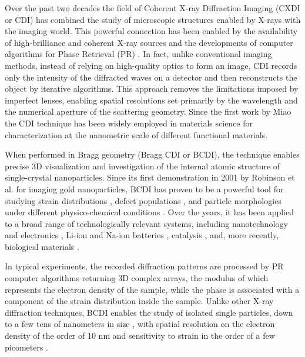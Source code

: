 Over the past two decades the field of Coherent X-ray Diffraction Imaging (CXDI or CDI) has combined the study of microscopic structures 
enabled by X-rays with the imaging world. This powerful connection has been enabled by the availability of high-brilliance and 
coherent X-ray sources and the developments of computer algorithms for Phase Retrieval (PR) \cite{fienup_reconstruction_1978, fienup_phase_1982,Luke_2004}. 
In fact, unlike conventional imaging methods, 
instead of relying on high-quality optics to form an image, CDI records only the intensity of the diffracted waves on 
a detector and then reconstructs the object by iterative algorithms. 
This approach removes the limitations imposed by imperfect lenses, enabling spatial resolutions set primarily by the 
wavelength and the numerical aperture of the scattering geometry. 
Since the first work by Miao \cite{Miao1998} the CDI technique has been widely employed in materials science for 
characterization at the nanometric scale of different functional materials. \cite{Neutze2000, Chapman2005, Schroer2008, Rodriguez2015}

When performed in Bragg geometry (Bragg CDI or BCDI), the technique enables precise 3D visualization and investigation 
of the internal atomic structure of single-crystal nanoparticles. Since its first demonstration in 2001 by Robinson 
et al. \cite{Robinson_gold_2001} for imaging gold nanoparticles, BCDI has proven to be a powerful tool for studying 
strain distributions \cite{pfeifer2006three, Robinson2009, Newton2010}, defect populations \cite{Favre-Nicolin_2010, Labat2015, Dupraz2017}, 
and particle morphologies under different physico-chemical conditions \cite{Carnis2021, FacetStrain2022, Chatelier2024, 
Grimes2024}. Over the years, it has been applied to a broad range of technologically relevant systems, including 
nanotechnology and electronics \cite{Favre-Nicolin_2010}, Li-ion and Na-ion batteries \cite{Singer2018, Serban2024}, 
catalysis \cite{atlan_imaging_2023}, and, more recently, biological materials \cite{Grunewald:ro5042}.

In typical experiments, the recorded diffraction patterns are processed by PR computer algorithms returning 
3D complex arrays, the modulus of which represents the electron density of the sample, while the phase is associated with
a component of the strain distribution inside the sample.  
Unlike other X-ray diffraction techniques, BCDI enables the study of isolated single particles, down to a few tens of 
nanometers in size \cite{MAXIV60nm, MIR20nm}, with spatial resolution on the electron density of the order of 10 nm \cite{cherukara_anisotropic_2018} 
and sensitivity to strain in the order of a few picometers \cite{Labat2015}.

